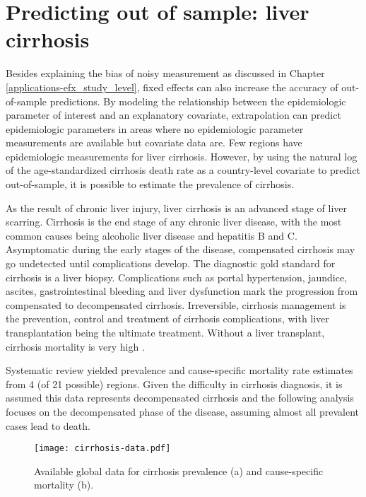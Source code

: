 \chapter{Predicting out of sample: liver cirrhosis}
\label{applications-efx_country_level}

Besides explaining the bias of noisy measurement as discussed in Chapter \ref{applications-efx_study_level}, fixed effects can also increase the accuracy of out-of-sample predictions.  By modeling the relationship between the epidemiologic parameter of interest and an explanatory covariate, extrapolation can predict epidemiologic parameters in areas where no epidemiologic parameter measurements are available but covariate data are.  Few regions have epidemiologic measurements for liver cirrhosis.  However, by using the natural log of the age-standardized cirrhosis death rate as a country-level covariate to predict out-of-sample, it is possible to estimate the prevalence of cirrhosis.

As the result of chronic liver injury, liver cirrhosis is an advanced stage of liver scarring.  Cirrhosis is the end stage of any chronic liver disease, with the most common causes being alcoholic liver disease and hepatitis B and C.  Asymptomatic during the early stages of the disease, compensated cirrhosis may go undetected until complications develop.  The diagnostic gold standard for cirrhosis is a liver biopsy.  Complications such as portal hypertension, jaundice, ascites, gastrointestinal bleeding and liver dysfunction mark the progression from compensated to decompensated cirrhosis.  Irreversible, cirrhosis management is the prevention, control and treatment of cirrhosis complications, with liver transplantation being the ultimate treatment.  Without a liver transplant, cirrhosis mortality is very high \cite{garcia-tsao_management_2009, d'amico_natural_2006, schuppan_liver_2008}.

Systematic review yielded prevalence and cause-specific mortality rate estimates from 4 (of 21 possible) regions.  Given the difficulty in cirrhosis diagnosis, it is assumed this data represents decompensated cirrhosis and the following analysis focuses on the decompensated phase of the disease, assuming almost all prevalent cases lead to death.

    \begin{figure}[h]
        \begin{center}
            \texttt{[image: cirrhosis-data.pdf]}
            \caption{Available global data for cirrhosis prevalence (a) and cause-specific mortality (b).}
            \label{fig:app-cirrhosis data}
        \end{center}
    \end{figure}

